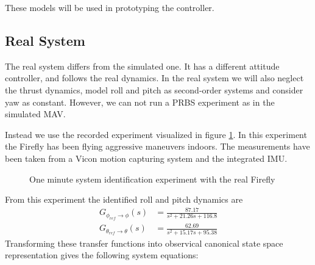These models will be used in prototyping the controller.

\subsection{Real System}
The real system differs from the simulated one. It has a different attitude controller, and follows the real dynamics. In the real system we will also neglect the thrust dynamics, model roll and pitch as second-order systems and consider yaw as constant. However, we can not run a PRBS experiment as in the simulated MAV.

Instead we use the recorded experiment visualized in figure \ref{fig:sys_id_real_exp}. In this experiment the Firefly has been flying aggressive maneuvers indoors. The measurements have been taken from a Vicon motion capturing system and the integrated IMU.
\begin{figure} 
\centering 
 
\caption{One minute system identification experiment with the real Firefly} 
\label{fig:sys_id_real_exp} 
\end{figure}

From this experiment the identified roll and pitch dynamics are
\begin{align}
G_{\phi_{ref} \rightarrow \phi}(s) &= \frac{87.17}{s^2+21.26s+116.8}  \label{eq:tf_phi_real} \\
G_{\theta_{ref} \rightarrow \theta}(s) &= \frac{62.69}{s^2+15.17s+95.38}  \label{eq:tf_theta_real}
\end{align}
Transforming these transfer functions into observical canonical state space representation gives the following system equations:

